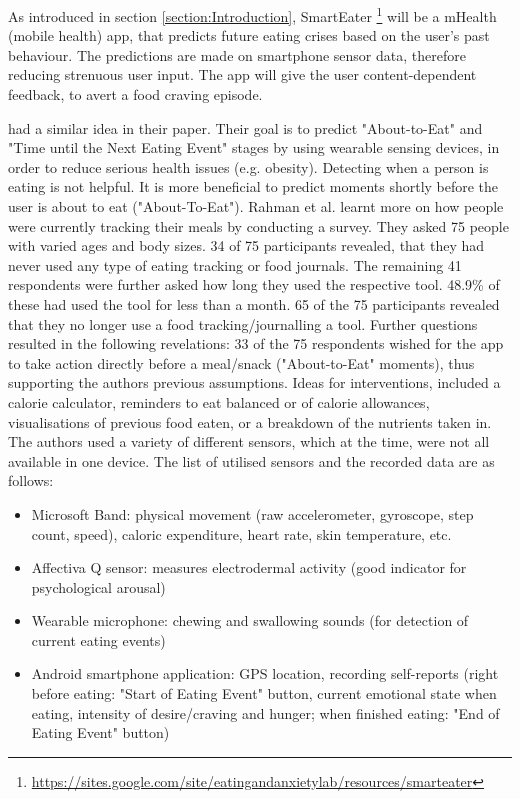 
As introduced in section \ref{section:Introduction}, SmartEater \footnote{\url{https://sites.google.com/site/eatingandanxietylab/resources/smarteater}} will be a mHealth (mobile health) app, that predicts future eating crises based on the user's past behaviour. The predictions are made on smartphone sensor data, therefore reducing strenuous user input. The app will give the user content-dependent feedback, to avert a food craving episode. 

\textcite{AboutToEat2016Rahman} had a similar idea in their paper. Their goal is to predict "About-to-Eat" and "Time until the Next Eating Event" stages by using wearable sensing devices, in order to reduce serious health issues (e.g. obesity). Detecting when a person is eating is not helpful. It is more beneficial to predict moments shortly before the user is about to eat ("About-To-Eat").
Rahman et al. learnt more on how people were currently tracking their meals by conducting a survey. They asked 75 people with varied ages and body sizes. 34 of 75 participants revealed, that they had never used any type of eating tracking or food journals. The remaining 41 respondents were further asked how long they used the respective tool. 48.9\% of these had used the tool for less than a month. 65 of the 75 participants revealed that they no longer use a food tracking/journalling a tool. Further questions resulted in the following revelations: 33 of the 75 respondents wished for the app to take action directly before a meal/snack ("About-to-Eat" moments), thus supporting the authors previous assumptions. Ideas for interventions, included a calorie calculator, reminders to eat balanced or of calorie allowances, visualisations of previous food eaten, or a breakdown of the nutrients taken in.
The authors used a variety of different sensors, which at the time, were not all available in one device. The list of utilised sensors and the recorded data are as follows:
\begin{itemize}
  \item Microsoft Band: physical movement (raw accelerometer, gyroscope, step count, speed), caloric expenditure, heart rate, skin temperature, etc. 
  \item Affectiva Q sensor: measures electrodermal activity (good indicator for psychological arousal) 
  \item Wearable microphone: chewing and swallowing sounds (for detection of current eating events)
  \item Android smartphone application: GPS location, recording self-reports (right before eating: "Start of Eating Event" button, current emotional state when eating, intensity of desire/craving and hunger; when finished eating: "End of Eating Event" button)
\end{itemize}
